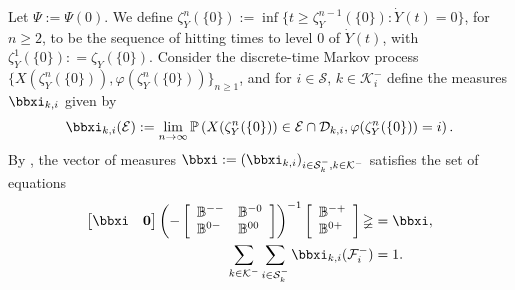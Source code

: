 Let $\mathbb\Psi := \mathbb\Psi(0)$. We define $\zeta_Y^n(\{0\}) := \inf\{t \geq \zeta_Y^{n - 1}(\{0\}): \dot Y(t) = 0\}$, for $n \geq  2$, to be the sequence of hitting times to level $0$ of $\dot Y(t)$, with $\zeta_Y^1(\{0\}): = \zeta_Y(\{0\})$. Consider the discrete-time Markov process $\{X({\zeta_Y^n(\{0\})}), \varphi(\zeta_Y^n(\{0\}))\}_{n \geq 1}$, and for $i \in \mathcal{S},\,k\in\mathcal K_i^-$ define the measures $\bbxi_{k,i}$ given by 
	\begin{align*}
		\bbxi_{k,i}(\mathcal{E}) := \lim_{n \rightarrow \infty} \mathbb{P}\left(X(\zeta_Y^n(\{0\})) \in \mathcal{E}\cap\calD_{k,i}, \varphi(\zeta_Y^n(\{0\})) = i\right).
	\end{align*} 
	By \cite{bo2014}, the vector of measures $\boldsymbol{\bbxi} := (\bbxi_{k,i})_{i \in \mathcal{S}_k^-,k\in\mathcal K^-}$ satisfies the set of equations 
 	\begin{align}
		\vligne{\boldsymbol{\bbxi}  & \boldsymbol{0}}\left(-\left[\begin{array}{ll} 
			\mathbb{B}^{--} & \mathbb{B}^{-0} \\
			\mathbb{B}^{0-} & \mathbb{B}^{00} 
		\end{array} \right]\right)^{-1}\left[\begin{array}{l} 
			\mathbb{B}^{-+} \\ 
			\mathbb{B}^{0+}
		\end{array} \right]\mathbb\Psi & = \boldsymbol{\bbxi}, \label{eqn:xi1}\\ 
		\sum_{k\in\mathcal K^-}\sum_{i \in \mathcal{S}_k^-}\bbxi_{k,i}(\mathcal{F}^-_i) & = 1. \label{eqn:xi2}
	\end{align} 

